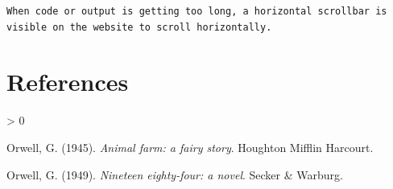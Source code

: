 \documentclass[
  14pt
  american,
  paper=a4,
  ,captions=tableheading
]{scrreprt}
\newlength{\cslhangindent}
\newenvironment{CSLReferences}[2] %
 {%
  \setlength{\parindent}{0pt}
  \ifodd #1 \everypar{\setlength{\hangindent}{\cslhangindent}}\ignorespaces\fi
  \ifnum #2 > 0
  \setlength{\parskip}{#2\baselineskip}
  \fi
 }%
 {}
\begin{document}
\begin{lstlisting}
When code or output is getting too long, a horizontal scrollbar is visible on the website to scroll horizontally.
\end{lstlisting}

\hypertarget{references}{%
\chapter*{References}\label{references}}

\hypertarget{refs}{}
\begin{CSLReferences}{1}{0}
\leavevmode\hypertarget{ref-orwell1945animal}{}%
Orwell, G. (1945). \emph{{Animal farm: a fairy story}}. Houghton Mifflin
Harcourt.

\leavevmode\hypertarget{ref-orwell1949nineteen}{}%
Orwell, G. (1949). \emph{{Nineteen eighty-four: a novel}}. Secker \&
Warburg.

\end{CSLReferences}

\end{document}
